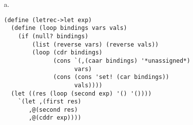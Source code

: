 \documentclass[a4paper,12pt]{article}
\newcommand{\subpar}[1]{\medskip \noindent #1.}
\begin{document}
\subpar{a}

\begin{lstlisting}
(define (letrec->let exp)
  (define (loop bindings vars vals)
    (if (null? bindings)
        (list (reverse vars) (reverse vals))
        (loop (cdr bindings)
              (cons `(,(caar bindings) '*unassigned*)
                    vars)
              (cons (cons 'set! (car bindings))
                    vals))))
  (let ((res (loop (second exp) '() '())))
    `(let ,(first res)
       ,@(second res)
       ,@(cddr exp))))
\end{lstlisting}
\end{document}
